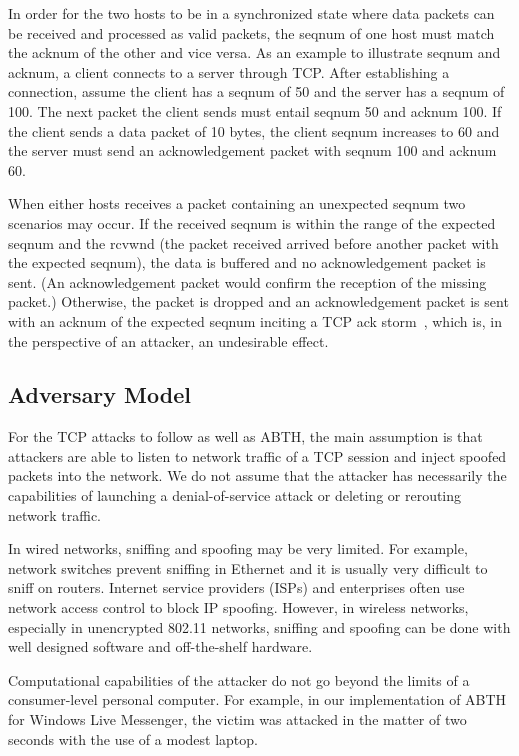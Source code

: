\documentclass{sig-alternate}
\begin{document}
In order for the two hosts to be in a synchronized state where data packets can be received and processed as valid packets, the seqnum of one host must match the acknum of the other and vice versa. 
As an example to illustrate seqnum and acknum, a client connects to a server through TCP.
After establishing a connection, assume the client has a seqnum of 50 and the server has a seqnum of 100.
The next packet the client sends must entail seqnum 50 and acknum 100.
If the client sends a data packet of 10 bytes, the client seqnum increases to 60 and the server must send an acknowledgement packet with seqnum 100 and acknum 60.

When either hosts receives a packet containing an unexpected seqnum two scenarios may occur.
If the received seqnum is within the range of the expected seqnum and the rcvwnd (the packet received arrived before another packet with the expected seqnum), the data is buffered and no acknowledgement packet is sent.
(An acknowledgement packet would confirm the reception of the missing packet.)
Otherwise, the packet is dropped and an acknowledgement packet is sent with an acknum of the expected seqnum inciting a TCP ack storm~\cite{joncheray:1995}, which is, in the perspective of an attacker, an undesirable effect.

\subsection{Adversary Model}
\label{sec:adversarymodel}

For the TCP attacks to follow as well as ABTH, the main assumption is that attackers are able to listen to network traffic of a TCP session and inject spoofed packets into the network.
We do not assume that the attacker has necessarily the capabilities of launching a denial-of-service attack or deleting or rerouting network traffic.

In wired networks, sniffing and spoofing may be very limited.
For example, network switches prevent sniffing in Ethernet and it is usually very difficult to sniff on routers.
Internet service providers (ISPs) and enterprises often use network access control to block IP spoofing.
However, in wireless networks, especially in unencrypted 802.11 networks, sniffing and spoofing can be done with well designed software and off-the-shelf hardware.

Computational capabilities of the attacker do not go beyond the limits of a consumer-level personal computer.
For example, in our implementation of ABTH for Windows Live Messenger, the victim was attacked in the matter of two seconds with the use of a modest laptop.
\end{document}

